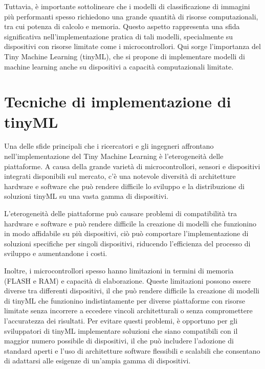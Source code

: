 Tuttavia, è importante sottolineare che i modelli di classificazione di immagini più performanti spesso richiedono una grande quantità di risorse computazionali, tra cui potenza di calcolo e memoria. Questo aspetto rappresenta una sfida significativa nell'implementazione pratica di tali modelli, specialmente su dispositivi con risorse limitate come i microcontrollori.
Qui sorge l'importanza del Tiny Machine Learning (tinyML), che si propone di implementare modelli di machine learning anche su dispositivi a capacità computazionali limitate.

\section{Tecniche di implementazione di tinyML}

Una delle sfide principali che i ricercatori e gli ingegneri affrontano nell'implementazione del Tiny Machine Learning è l'eterogeneità delle piattaforme. A causa della grande varietà di microcontrollori, sensori e dispositivi integrati disponibili sul mercato, c'è una notevole diversità di architetture hardware e software che può rendere difficile lo sviluppo e la distribuzione di soluzioni tinyML su una vasta gamma di dispositivi. 

L'eterogeneità delle piattaforme può causare problemi di compatibilità tra hardware e software e può rendere difficile la creazione di modelli che funzionino in modo affidabile su più dispositivi, ciò può comportare l'implementazione di soluzioni specifiche per singoli dispositivi, riducendo l'efficienza del processo di sviluppo e aumentandone i costi.

Inoltre, i microcontrollori spesso hanno limitazioni in termini di memoria (FLASH e RAM) e capacità di elaborazione. Queste limitazioni possono essere diverse tra differenti dispositivi, il che può rendere difficile la creazione di modelli di tinyML che funzionino indistintamente per diverse piattaforme con risorse limitate senza incorrere a eccedere vincoli architetturali o senza compromettere l'accuratezza dei risultati.
Per evitare questi problemi, è opportuno per gli sviluppatori di tinyML implementare soluzioni che siano compatibili con il maggior numero possibile di dispositivi, il che può includere l'adozione di standard aperti e l'uso di architetture software flessibili e scalabili che consentano di adattarsi alle esigenze di un'ampia gamma di dispositivi.

